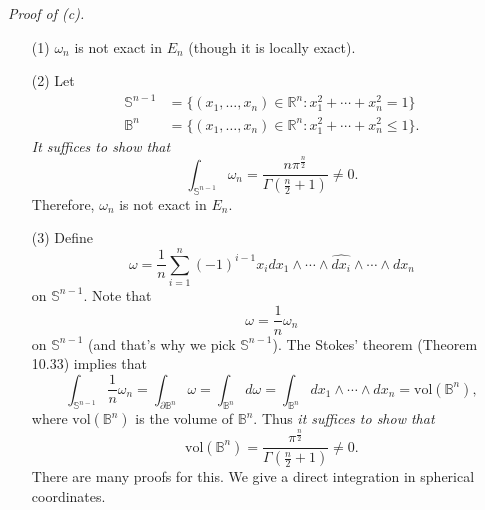 \documentclass{article}
\begin{document}



\emph{Proof of (c).}
\begin{enumerate}
\item[(1)]
  $\omega_n$ is not exact in $E_n$ (though it is locally exact).

\item[(2)]
  Let
  \begin{align*}
    \mathbb{S}^{n-1}
    &= \{ (x_1,\ldots,x_n) \in \mathbb{R}^n : x_1^2+\cdots+x_n^2 = 1 \} \\
    \mathbb{B}^{n}
    &= \{ (x_1,\ldots,x_n) \in \mathbb{R}^n : x_1^2+\cdots+x_n^2 \leq 1 \}.
  \end{align*}
  \emph{It suffices to show that}
  \[
    \int_{\mathbb{S}^{n-1}} \omega_n
    = \frac{n \pi^{\frac{n}{2}}}{\Gamma\left(\frac{n}{2}+1\right)} \neq 0.
  \]
  Therefore, $\omega_n$ is not exact in $E_n$.

\item[(3)]
  Define
  \[
    \omega = \frac{1}{n} \sum_{i=1}^{n} (-1)^{i-1} x_i
    dx_1 \wedge \cdots \wedge \widehat{dx_i} \wedge \cdots \wedge dx_{n}
  \]
  on $\mathbb{S}^{n-1}$.
  Note that
  \[
    \omega = \frac{1}{n} \omega_n
  \]
  on $\mathbb{S}^{n-1}$ (and that's why we pick $\mathbb{S}^{n-1}$).
  The Stokes' theorem (Theorem 10.33) implies that
  \[
    \int_{\mathbb{S}^{n-1}} \frac{1}{n} \omega_n
    = \int_{\partial \mathbb{B}^{n}} \omega
    = \int_{\mathbb{B}^{n}} d\omega
    = \int_{\mathbb{B}^{n}} dx_1 \wedge \cdots \wedge dx_n
    = \mathrm{vol}(\mathbb{B}^n),
  \]
  where $\mathrm{vol}(\mathbb{B}^n)$ is the volume of $\mathbb{B}^n$.
  Thus
  \emph{it suffices to show that}
  \[
    \mathrm{vol}(\mathbb{B}^n)
    = \frac{\pi^{\frac{n}{2}}}{\Gamma\left(\frac{n}{2}+1\right)} \neq 0.
  \]
  There are many proofs for this.
  We give a direct integration in spherical coordinates.


\end{enumerate}
\end{document}
